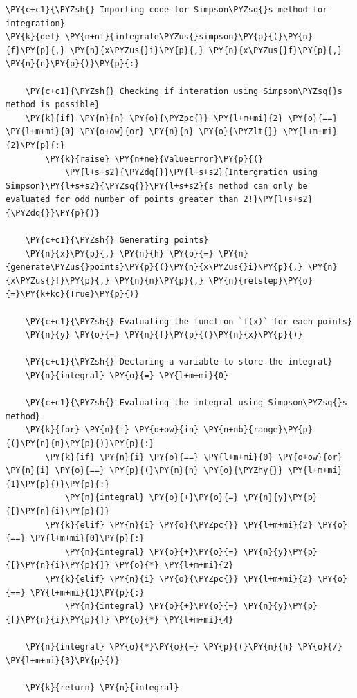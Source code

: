     \begin{tcolorbox}[breakable, size=fbox, boxrule=1pt, pad at break*=1mm,colback=cellbackground, colframe=cellborder]
\begin{Verbatim}[commandchars=\\\{\}]
\PY{c+c1}{\PYZsh{} Importing code for Simpson\PYZsq{}s method for integration}
\PY{k}{def} \PY{n+nf}{integrate\PYZus{}simpson}\PY{p}{(}\PY{n}{f}\PY{p}{,} \PY{n}{x\PYZus{}i}\PY{p}{,} \PY{n}{x\PYZus{}f}\PY{p}{,} \PY{n}{n}\PY{p}{)}\PY{p}{:}

    \PY{c+c1}{\PYZsh{} Checking if interation using Simpson\PYZsq{}s method is possible}
    \PY{k}{if} \PY{n}{n} \PY{o}{\PYZpc{}} \PY{l+m+mi}{2} \PY{o}{==} \PY{l+m+mi}{0} \PY{o+ow}{or} \PY{n}{n} \PY{o}{\PYZlt{}} \PY{l+m+mi}{2}\PY{p}{:}
        \PY{k}{raise} \PY{n+ne}{ValueError}\PY{p}{(}
            \PY{l+s+s2}{\PYZdq{}}\PY{l+s+s2}{Intergration using Simpson}\PY{l+s+s2}{\PYZsq{}}\PY{l+s+s2}{s method can only be evaluated for odd number of points greater than 2!}\PY{l+s+s2}{\PYZdq{}}\PY{p}{)}

    \PY{c+c1}{\PYZsh{} Generating points}
    \PY{n}{x}\PY{p}{,} \PY{n}{h} \PY{o}{=} \PY{n}{generate\PYZus{}points}\PY{p}{(}\PY{n}{x\PYZus{}i}\PY{p}{,} \PY{n}{x\PYZus{}f}\PY{p}{,} \PY{n}{n}\PY{p}{,} \PY{n}{retstep}\PY{o}{=}\PY{k+kc}{True}\PY{p}{)}

    \PY{c+c1}{\PYZsh{} Evaluating the function `f(x)` for each points}
    \PY{n}{y} \PY{o}{=} \PY{n}{f}\PY{p}{(}\PY{n}{x}\PY{p}{)}

    \PY{c+c1}{\PYZsh{} Declaring a variable to store the integral}
    \PY{n}{integral} \PY{o}{=} \PY{l+m+mi}{0}

    \PY{c+c1}{\PYZsh{} Evaluating the integral using Simpson\PYZsq{}s method}
    \PY{k}{for} \PY{n}{i} \PY{o+ow}{in} \PY{n+nb}{range}\PY{p}{(}\PY{n}{n}\PY{p}{)}\PY{p}{:}
        \PY{k}{if} \PY{n}{i} \PY{o}{==} \PY{l+m+mi}{0} \PY{o+ow}{or} \PY{n}{i} \PY{o}{==} \PY{p}{(}\PY{n}{n} \PY{o}{\PYZhy{}} \PY{l+m+mi}{1}\PY{p}{)}\PY{p}{:}
            \PY{n}{integral} \PY{o}{+}\PY{o}{=} \PY{n}{y}\PY{p}{[}\PY{n}{i}\PY{p}{]}
        \PY{k}{elif} \PY{n}{i} \PY{o}{\PYZpc{}} \PY{l+m+mi}{2} \PY{o}{==} \PY{l+m+mi}{0}\PY{p}{:}
            \PY{n}{integral} \PY{o}{+}\PY{o}{=} \PY{n}{y}\PY{p}{[}\PY{n}{i}\PY{p}{]} \PY{o}{*} \PY{l+m+mi}{2}
        \PY{k}{elif} \PY{n}{i} \PY{o}{\PYZpc{}} \PY{l+m+mi}{2} \PY{o}{==} \PY{l+m+mi}{1}\PY{p}{:}
            \PY{n}{integral} \PY{o}{+}\PY{o}{=} \PY{n}{y}\PY{p}{[}\PY{n}{i}\PY{p}{]} \PY{o}{*} \PY{l+m+mi}{4}

    \PY{n}{integral} \PY{o}{*}\PY{o}{=} \PY{p}{(}\PY{n}{h} \PY{o}{/} \PY{l+m+mi}{3}\PY{p}{)}

    \PY{k}{return} \PY{n}{integral}
\end{Verbatim}
\end{tcolorbox}

